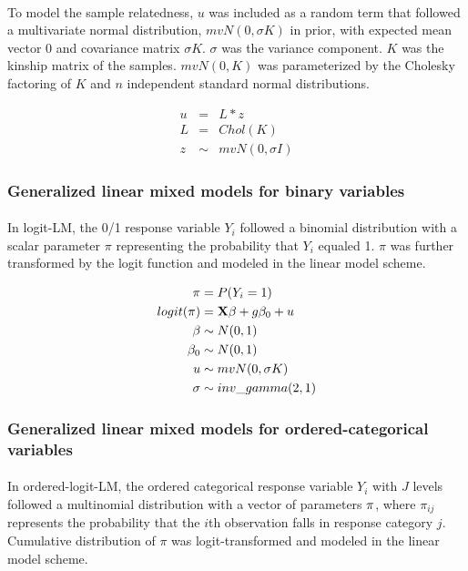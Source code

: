 \documentclass[12pt]{article}
\begin{document}
\paragraph{}{
To model the sample relatedness, $u$ was included as a random term that followed a multivariate normal distribution, $mvN(0, \sigma K)$ in prior, with expected mean vector 0 and covariance matrix $\sigma K$. $\sigma$ was the variance component. $K$ was the kinship matrix of the samples. $mvN(0, K)$ was parameterized by the Cholesky factoring of $K$ and $n$ independent standard normal distributions.
}

\begin{eqnarray}
   u & = &  L * z \\
   L & = & Chol(K) \\
   z & \sim & mvN(0, \sigma I)
\end{eqnarray}

\subsubsection*{Generalized linear mixed models for binary variables}

\paragraph{}{
 In logit-LM, the 0/1 response variable $Y_i$ followed a binomial distribution with a scalar parameter $\pi$ representing the probability that $Y_i$ equaled 1. $\pi$ was further transformed by the logit function and modeled in the linear model scheme. 
}

\begin{align}
   \pi & = P(Y_i = 1) \\
   logit(\pi) & = \bold{X} \beta + g \beta_0 + u \\
   \beta & \sim N(0, 1) \\
   \beta_0 & \sim N(0, 1) \\
   u & \sim mvN(0, \sigma K) \\
   \sigma & \sim inv\_gamma(2, 1)
\end{align}

\subsubsection*{Generalized linear mixed models for ordered-categorical variables}

\paragraph{}{
In ordered-logit-LM, the ordered categorical response variable $Y_i$ with $J$ levels followed a multinomial distribution with a vector of parameters $\bold{\pi}$, where $\pi_{ij}$ represents the probability that the $i$th observation falls in response category $j$. Cumulative distribution of $\pi$ was logit-transformed and modeled in the linear model scheme.
}
\end{document}

